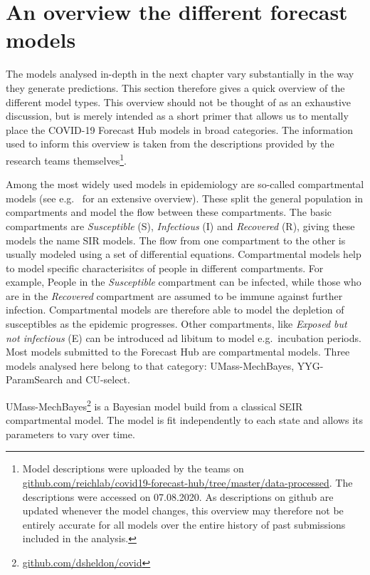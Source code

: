 \documentclass[
]{book}
\begin{document}
\hypertarget{an-overview-the-different-forecast-models}{%
\section{An overview the different forecast models}\label{an-overview-the-different-forecast-models}}

The models analysed in-depth in the next chapter vary substantially in the way they generate predictions. This section therefore gives a quick overview of the different model types. This overview should not be thought of as an exhaustive discussion, but is merely intended as a short primer that allows us to mentally place the COVID-19 Forecast Hub models in broad categories. The information used to inform this overview is taken from the descriptions provided by the research teams themselves\footnote{Model descriptions were uploaded by the teams on \href{https://github.com/reichlab/covid19-forecast-hub/tree/master/data-processed}{github.com/reichlab/covid19-forecast-hub/tree/master/data-processed}. The descriptions were accessed on 07.08.2020. As descriptions on github are updated whenever the model changes, this overview may therefore not be entirely accurate for all models over the entire history of past submissions included in the analysis.}.

Among the most widely used models in epidemiology are so-called compartmental models (see e.g.~\citet{brauerCompartmentalModelsEpidemiology2008} for an extensive overview). These split the general population in compartments and model the flow between these compartments. The basic compartments are \emph{Susceptible} (S), \emph{Infectious} (I) and \emph{Recovered} (R), giving these models the name SIR models. The flow from one compartment to the other is usually modeled using a set of differential equations. Compartmental models help to model specific characterisitcs of people in different compartments. For example, People in the \emph{Susceptible} compartment can be infected, while those who are in the \emph{Recovered} compartment are assumed to be immune against further infection. Compartmental models are therefore able to model the depletion of susceptibles as the epidemic progresses. Other compartments, like \emph{Exposed but not infectious} (E) can be introduced ad libitum to model e.g.~incubation periods. Most models submitted to the Forecast Hub are compartmental models. Three models analysed here belong to that category: UMass-MechBayes, YYG-ParamSearch and CU-select.

UMass-MechBayes\footnote{\href{https://github.com/dsheldon/covid}{github.com/dsheldon/covid}} is a Bayesian model build from a classical SEIR compartmental model. The model is fit independently to each state and allows its parameters to vary over time.
\end{document}
